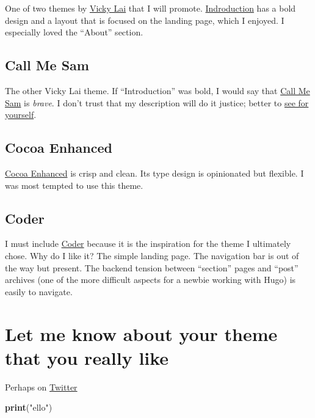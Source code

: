 \documentclass[]{article}
\newenvironment{Shaded}{\begin{snugshade}}{\end{snugshade}}
\newcommand{\KeywordTok}[1]{\textcolor[rgb]{0.13,0.29,0.53}{\textbf{#1}}}
\newcommand{\NormalTok}[1]{#1}
\newcommand{\StringTok}[1]{\textcolor[rgb]{0.31,0.60,0.02}{#1}}
\theoremstyle{definition}
\theoremstyle{definition}
\theoremstyle{definition}
\theoremstyle{remark}
\begin{document}
One of two themes by \href{https://vickylai.com/}{Vicky Lai} that I will
promote.
\href{https://themes.gohugo.io/hugo-theme-introduction/}{Indroduction}
has a bold design and a layout that is focused on the landing page,
which I enjoyed. I especially loved the ``About'' section.

\hypertarget{call-me-sam}{%
\subsection{Call Me Sam}\label{call-me-sam}}

The other Vicky Lai theme. If ``Introduction'' was bold, I would say
that \href{https://themes.gohugo.io/hugo-theme-sam/}{Call Me Sam} is
\emph{brave}. I don't trust that my description will do it justice;
better to \href{http://vickylai.com/call-me-sam}{see for yourself}.

\hypertarget{cocoa-enhanced}{%
\subsection{Cocoa Enhanced}\label{cocoa-enhanced}}

\href{https://themes.gohugo.io/cocoa-eh-hugo-theme/}{Cocoa Enhanced} is
crisp and clean. Its type design is opinionated but flexible. I was most
tempted to use this theme.

\hypertarget{coder}{%
\subsection{Coder}\label{coder}}

I must include \href{https://themes.gohugo.io/hugo-coder/}{Coder}
because it is the inspiration for the theme I ultimately chose. Why do I
like it? The simple landing page. The navigation bar is out of the way
but present. The backend tension between ``section'' pages and ``post''
archives (one of the more difficult aspects for a newbie working with
Hugo) is easily to navigate.

\hypertarget{let-me-know-about-your-theme-that-you-really-like}{%
\section{Let me know about your theme that you really
like}\label{let-me-know-about-your-theme-that-you-really-like}}

Perhaps on \href{https://twitter.com/mikedecr}{Twitter}

\begin{Shaded}
\begin{Highlighting}[]
\KeywordTok{print}\NormalTok{(}\StringTok{"ello"}\NormalTok{)}
\end{Highlighting}
\end{Shaded}
\end{document}

